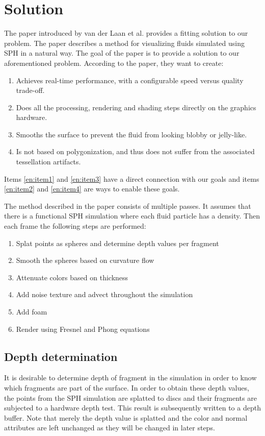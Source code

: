 \section{Solution}
The paper introduced by van der Laan et al. \cite{van2009screen} provides a fitting solution to our problem.
The paper describes a method for visualizing fluids simulated using SPH in a natural way.
The goal of the paper is to provide a solution to our aforementioned problem.
According to the paper, they want to create:
\begin{enumerate}
	\item \label{en:item1} Achieves real-time performance, with a configurable speed versus quality trade-off.
	\item \label{en:item2} Does all the processing, rendering and shading steps directly on the graphics hardware.
	\item \label{en:item3} Smooths the surface to prevent the fluid from looking blobby or jelly-like.
	\item \label{en:item4} Is not based on polygonization, and thus does not suffer from the associated tessellation artifacts.
\end{enumerate}

Items \ref{en:item1} and \ref{en:item3} have a direct connection with our goals and items \ref{en:item2} and \ref{en:item4} are ways to enable these goals.

The method described in the paper consists of multiple passes. It assumes that there is a functional SPH simulation where each fluid particle has a density. Then each frame the following steps are performed:
\begin{enumerate}
	\item Splat points as spheres and determine depth values per fragment
	\item Smooth the spheres based on curvature flow
	\item Attenuate colors based on thickness
	\item Add noise texture and advect throughout the simulation
	\item Add foam
	\item Render using Fresnel and Phong equations
\end{enumerate}

\subsection{Depth determination}
It is desirable to determine depth of fragment in the simulation in order to know which fragments are part of the surface. 
In order to obtain these depth values, the points from the SPH simulation are splatted to discs and their fragments are subjected to a hardware depth test. 
This result is subsequently written to a depth buffer. 
Note that merely the depth value is splatted and the color and normal attributes are left unchanged as they will be changed in later steps.

